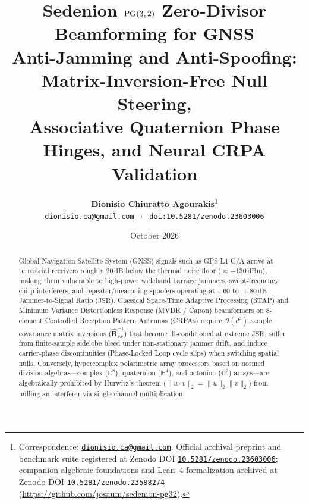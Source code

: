 \documentclass[11pt,a4paper]{article}
\title{\textbf{Sedenion $\mathrm{PG}(3,2)$ Zero-Divisor Beamforming for GNSS\\
Anti-Jamming and Anti-Spoofing: Matrix-Inversion-Free Null Steering,\\
Associative Quaternion Phase Hinges, and Neural CRPA Validation}}
\author{
  \textbf{Dionisio Chiuratto Agourakis}\thanks{Correspondence: \href{mailto:dionisio.ca@gmail.com}{\texttt{dionisio.ca@gmail.com}}. Official archival preprint and benchmark suite registered at Zenodo DOI \href{https://doi.org/10.5281/zenodo.23603006}{\texttt{10.5281/zenodo.23603006}}; companion algebraic foundations and Lean~4 formalization archived at Zenodo DOI \href{https://doi.org/10.5281/zenodo.23588274}{\texttt{10.5281/zenodo.23588274}} (\url{https://github.com/josaum/sedenion-pg32}).} \\[0.4em]
  \small \href{mailto:dionisio.ca@gmail.com}{\texttt{dionisio.ca@gmail.com}} $\;\cdot\;$ \href{https://doi.org/10.5281/zenodo.23603006}{\texttt{doi:10.5281/zenodo.23603006}}
}
\date{October 2026}
\theoremstyle{definition}
\theoremstyle{remark}
\newcommand{\C}{\mathbb{C}}
\newcommand{\Ha}{\mathbb{H}}
\newcommand{\Oc}{\mathbb{O}}
\begin{document}
\maketitle

\begin{abstract}
\noindent
Global Navigation Satellite System (GNSS) signals such as GPS L1 C/A arrive at terrestrial receivers roughly $20\,\mathrm{dB}$ below the thermal noise floor ($\approx -130\,\mathrm{dBm}$), making them vulnerable to high-power wideband barrage jammers, swept-frequency chirp interferers, and repeater/meaconing spoofers operating at $+60\text{ to }+80\,\mathrm{dB}$ Jammer-to-Signal Ratio ($\mathrm{JSR}$). Classical Space-Time Adaptive Processing (STAP) and Minimum Variance Distortionless Response (MVDR / Capon) beamformers on 8-element Controlled Reception Pattern Antennas (CRPAs) require $\mathcal{O}(d^3)$ sample covariance matrix inversions ($\hat{\bm{R}}_{xx}^{-1}$) that become ill-conditioned at extreme $\mathrm{JSR}$, suffer from finite-sample sidelobe bleed under non-stationary jammer drift, and induce carrier-phase discontinuities (Phase-Locked Loop cycle slips) when switching spatial nulls. Conversely, hypercomplex polarimetric array processors based on normed division algebras---complex ($\C^8$), quaternion ($\Ha^4$), and octonion ($\Oc^2$) arrays---are algebraically prohibited by Hurwitz's theorem ($\|u \cdot v\|_2 = \|u\|_2 \|v\|_2$) from nulling an interferer via single-channel multiplication.


\end{abstract}
\end{document}
